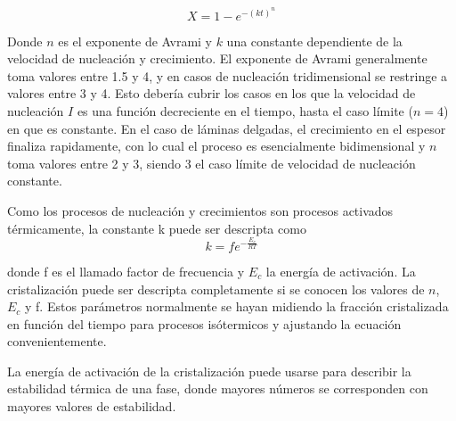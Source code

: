 \documentclass[12pt]{article}
\theoremstyle{definition}
\theoremstyle{remark}
\begin{document}
\begin{equation}
	X = 1 - e^{-(kt)^n}
\end{equation}

Donde $n$ es el exponente de Avrami y $k$ una constante dependiente de la velocidad de nucleación y crecimiento.
	El exponente de Avrami generalmente toma valores entre 1.5 y 4, y en casos de nucleación tridimensional se restringe a valores entre 3 y 4. Esto debería cubrir los casos en los que la velocidad de nucleación $I$ es una función decreciente en el tiempo, hasta el caso límite ($n = 4$) en que es constante. En el caso de láminas delgadas, el crecimiento en el espesor finaliza rapidamente, con lo cual el proceso es esencialmente bidimensional y $n$ toma valores entre 2 y 3, siendo 3 el caso límite de velocidad de nucleación constante. 
	
Como los procesos de nucleación y crecimientos son procesos activados térmicamente, la constante k puede ser descripta como
\begin{equation}
\label{kvalue}
	k=fe^{-\frac{E_c}{RT}}
\end{equation}

donde f es el llamado factor de frecuencia y $E_c$ la energía de activación.
La cristalización puede ser descripta completamente si se conocen los valores de $n$, $E_c$ y f. Estos parámetros normalmente se hayan midiendo la fracción cristalizada en función del tiempo para procesos isótermicos y ajustando la ecuación convenientemente.

La energía de activación de la cristalización puede usarse para describir la estabilidad térmica de una fase, donde mayores números se corresponden con mayores valores de estabilidad.
\end{document}

